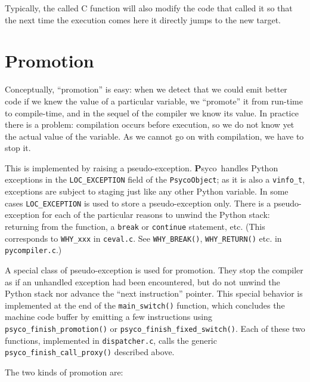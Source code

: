\documentclass{article}
\def\Psyco{{\bf P}syco}
\def\code#1{\texttt{#1}}
\begin{document}
Typically, the called C function will also modify the code that called it so that the next time the execution comes here it directly jumps to the new target.



\section{Promotion}\label{secpromotion}


Conceptually, ``promotion'' is easy: when we detect that we could emit better code if we knew the value of a particular variable, we ``promote'' it from run-time to compile-time, and in the sequel of the compiler we know its value. In practice there is a problem: compilation occurs before execution, so we do not know yet the actual value of the variable. As we cannot go on with compilation, we have to stop it.

This is implemented by raising a pseudo-exception. \Psyco\ handles Python exceptions in the \code{LOC_EXCEPTION} field of the \code{PsycoObject}; as it is also a \code{vinfo_t}, exceptions are subject to staging just like any other Python variable. In some cases \code{LOC_EXCEPTION} is used to store a pseudo-exception only. There is a pseudo-exception for each of the particular reasons to unwind the Python stack: returning from the function, a \code{break} or \code{continue} statement, etc. (This corresponds to \code{WHY_xxx} in \code{ceval.c}. See \code{WHY_BREAK()}, \code{WHY_RETURN()} etc. in \code{pycompiler.c}.)

A special class of pseudo-exception is used for promotion. They stop the compiler as if an unhandled exception had been encountered, but do not unwind the Python stack nor advance the ``next instruction'' pointer. This special behavior is implemented at the end of the \code{main_switch()} function, which concludes the machine code buffer by emitting a few instructions using \code{psyco_finish_promotion()} or \code{psyco_finish_fixed_switch()}. Each of these two functions, implemented in \code{dispatcher.c}, calls the generic \code{psyco_finish_call_proxy()} described above.

\medskip

The two kinds of promotion are:
\end{document}
